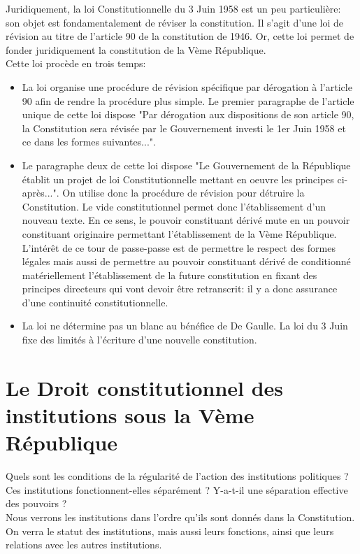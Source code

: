 \documentclass[12pt, a4paper, openany]{book}
\begin{document}
Juridiquement, la loi Constitutionnelle du 3 Juin 1958 est un peu particulière: son objet est fondamentalement de réviser la constitution. Il s'agit d'une loi de révision au titre de l'article 90 de la constitution de 1946. Or, cette loi permet de fonder juridiquement la constitution de la Vème République. \\
Cette loi procède en trois temps:
\begin{itemize}
\item La loi organise une procédure de révision spécifique par dérogation à l'article 90 afin de rendre la procédure plus simple. Le premier paragraphe de l'article unique de cette loi dispose "Par dérogation aux dispositions de son article 90, la Constitution sera révisée par le Gouvernement investi le 1er Juin 1958 et ce dans les formes suivantes...".
\item Le paragraphe deux de cette loi dispose "Le Gouvernement de la République établit un projet de loi Constitutionnelle mettant en oeuvre les principes ci-après...". On utilise donc la procédure de révision pour détruire la Constitution. Le vide constitutionnel permet donc l'établissement d'un nouveau texte. En ce sens, le pouvoir constituant dérivé mute en un pouvoir constituant originaire permettant l'établissement de la Vème République. L'intérêt de ce tour de passe-passe est de permettre le respect des formes légales mais aussi de permettre au pouvoir constituant dérivé de conditionné matériellement l'établissement de la future constitution en fixant des principes directeurs qui vont devoir être retranscrit: il y a donc assurance d'une continuité constitutionnelle. 
\item La loi ne détermine pas un blanc au bénéfice de De Gaulle. La loi du 3 Juin fixe des limités à l'écriture d'une nouvelle constitution. 
\end{itemize}



\part{Le Droit constitutionnel des institutions sous la Vème République}

Quels sont les conditions de la régularité de l'action des institutions politiques ? \\
Ces institutions fonctionnent-elles séparément ? Y-a-t-il une séparation effective des pouvoirs ? \\
Nous verrons les institutions dans l'ordre qu'ils sont donnés dans la Constitution. On verra le statut des institutions, mais aussi leurs fonctions, ainsi que leurs relations avec les autres institutions.
\end{document}

